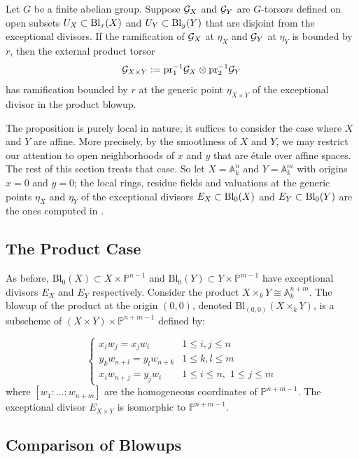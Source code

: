 \begin{prop}\label{prop:ramification-external-product}
Let $G$ be a finite abelian group. Suppose $\mathcal{G}_X$ and $\mathcal{G}_Y$ are $G$-torsors defined on open subsets $U_X \subset \operatorname{Bl}_x(X)$ and $U_Y \subset \operatorname{Bl}_y(Y)$ that are disjoint
from the exceptional divisors.
If the ramification of $\mathcal{G}_X$ at $\eta_X$ and $\mathcal{G}_Y$ at $\eta_Y$ is bounded by $r$, then the external product torsor
\[
\mathcal{G}_{X \times Y} := \text{pr}_1^{-1} \mathcal{G}_X \otimes \text{pr}_2^{-1} \mathcal{G}_Y
\]
has ramification bounded by $r$ at the generic point $\eta_{X\times Y}$ of the exceptional divisor in the product blowup.
\end{prop}

The proposition is purely local in nature; it suffices to consider the case where $X$ and $Y$ are affine.
More precisely, by the smoothness of $X$ and $Y$, we may restrict our attention to open neighborhoods of $x$ and $y$ that are étale over affine spaces.
The rest of this section treats that case. So let $X = \mathbb{A}^n_k$ and
$Y = \mathbb{A}^m_k$ with origins $x = 0$ and $y = 0$; the local rings, residue
fields and valuations at the generic points $\eta_X$ and $\eta_Y$ of the
exceptional divisors $E_X \subset \operatorname{Bl}_0(X)$ and $E_Y \subset \operatorname{Bl}_0(Y)$ are the
ones computed in .

\subsection*{The Product Case}
As before, $\text{Bl}_0(X) \subset X \times \mathbb{P}^{n-1}$ and $\text{Bl}_0(Y) \subset Y \times \mathbb{P}^{m-1}$ have exceptional divisors $E_X$ and $E_Y$ respectively.
Consider the product $X \times_k Y \cong \mathbb{A}_k^{n+m}$.
The blowup of the product at the origin $(0,0)$, denoted $\text{Bl}_{(0,0)}(X \times_k Y)$, is a subscheme of $(X \times Y) \times \mathbb{P}^{n+m-1}$ defined by:

$$\begin{cases}
x_i w_j = x_j w_i & 1 \le i, j \le n \\
y_k w_{n+l} = y_l w_{n+k} & 1 \le k, l \le m \\
x_i w_{n+j} = y_j w_i & 1 \le i \le n, \,\, 1 \le j \le m
\end{cases}$$
where $[w_1 : \dots : w_{n+m}]$ are the homogeneous coordinates of $\mathbb{P}^{n+m-1}$. The exceptional divisor $E_{X \times Y}$ is isomorphic to $\mathbb{P}^{n+m-1}$.

\subsection*{Comparison of Blowups}

